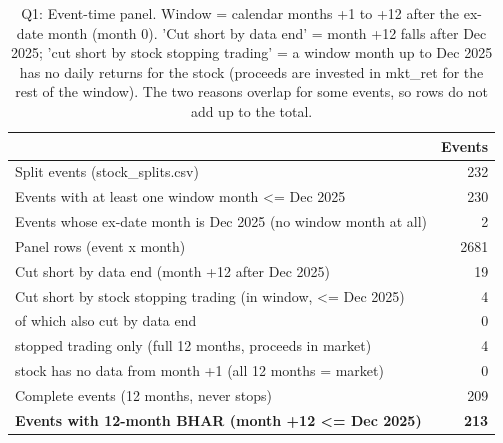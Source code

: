 \begin{table}[!htbp]
\centering
\small
\caption{Q1: Event-time panel. Window = calendar months +1 to +12 after the ex-date month (month 0). 'Cut short by data end' = month +12 falls after Dec 2025; 'cut short by stock stopping trading' = a window month up to Dec 2025 has no daily returns for the stock (proceeds are invested in mkt\_ret for the rest of the window). The two reasons overlap for some events, so rows do not add up to the total.}
\label{tab:q1}
\begin{tabular}{p{11cm}r}
\toprule
 & Events \\
\midrule
Split events (stock\_splits.csv) & 232 \\
Events with at least one window month <= Dec 2025 & 230 \\
Events whose ex-date month is Dec 2025 (no window month at all) & 2 \\
\addlinespace
Panel rows (event x month) & 2681 \\
\addlinespace
Cut short by data end (month +12 after Dec 2025) & 19 \\
Cut short by stock stopping trading (in window, <= Dec 2025) & 4 \\
   of which also cut by data end & 0 \\
   stopped trading only (full 12 months, proceeds in market) & 4 \\
   stock has no data from month +1 (all 12 months = market) & 0 \\
\addlinespace
Complete events (12 months, never stops) & 209 \\
\rowcolor[gray]{0.94} \textbf{Events with 12-month BHAR (month +12 <= Dec 2025)} & \textbf{213} \\
\bottomrule
\end{tabular}
\end{table}
